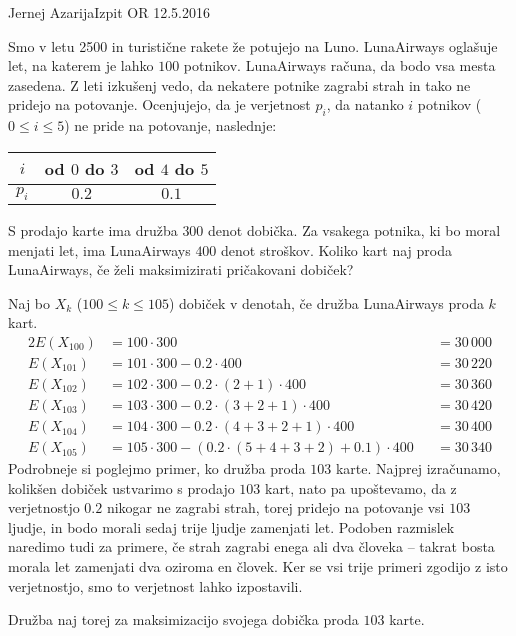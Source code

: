 \begin{naloga}{Jernej Azarija}{Izpit OR 12.5.2016}
\begin{vprasanje}
Smo v letu 2500 in turistične rakete že potujejo na Luno.
LunaAirways oglašuje let, na katerem je lahko $100$ potnikov.
LunaAirways računa, da bodo vsa mesta zasedena.
Z leti izkušenj vedo,
da nekatere potnike zagrabi strah in tako ne pridejo na potovanje.
Ocenjujejo, da je verjetnost $p_i$,
da natanko $i$ potnikov ($0 \le i \le 5$) ne pride na potovanje,
naslednje:
\begin{center}
\begin{tabular}{c|cc}
$i$ & od $0$ do $3$ & od $4$ do $5$ \\ \hline
$p_i$ & $0.2$ & $0.1$
\end{tabular}
\end{center}

S prodajo karte ima družba $300$ denot dobička.
Za vsakega potnika, ki bo moral menjati let,
ima LunaAirways $400$ denot stroškov.
Koliko kart naj proda LunaAirways, če želi maksimizirati pričakovani dobiček?
\end{vprasanje}

\begin{odgovor}
Naj bo $X_k$ ($100 \le k \le 105$) dobiček v denotah,
če družba LunaAirways proda $k$ kart.
\begin{alignat*}{2}
E(X_{100}) &= 100 \cdot 300 &&= 30\,000 \\
E(X_{101}) &= 101 \cdot 300 - 0.2 \cdot 400 &&= 30\,220\\
E(X_{102}) &= 102 \cdot 300 - 0.2 \cdot (2+1) \cdot 400 &&= 30\,360\\
E(X_{103}) &= 103 \cdot 300 - 0.2 \cdot (3+2+1) \cdot 400 &&= 30\,420\\
E(X_{104}) &= 104 \cdot 300 - 0.2 \cdot (4+3+2+1) \cdot 400 &&= 30\,400\\
E(X_{105}) &= 105 \cdot 300 - (0.2 \cdot (5+4+3+2) + 0.1) \cdot 400 &&= 30\,340
\end{alignat*}
Podrobneje si poglejmo primer, ko družba proda $103$ karte.
Najprej izračunamo, kolikšen dobiček ustvarimo s prodajo $103$ kart,
nato pa upoštevamo, da z ve\-rjet\-nost\-jo $0.2$ nikogar ne zagrabi strah,
torej pridejo na potovanje vsi $103$ ljudje,
in bodo morali sedaj trije ljudje zamenjati let.
Podoben razmislek naredimo tudi za primere,
če strah zagrabi enega ali dva človeka
-- takrat bosta morala let zamenjati dva oziroma en človek.
Ker se vsi trije primeri zgodijo z isto verjetnostjo,
smo to verjetnost lahko izpostavili.

Družba naj torej za maksimizacijo svojega dobička proda $103$ karte.
\end{odgovor}
\end{naloga}

